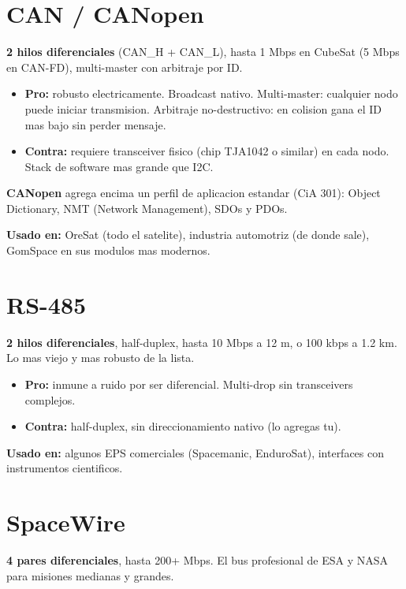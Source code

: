 \documentclass[11pt,a4paper,oneside,openright]{book}
\begin{document}
\section{CAN / CANopen}

\textbf{2 hilos diferenciales} (CAN\_H + CAN\_L), hasta 1 Mbps en
CubeSat (5 Mbps en CAN-FD), multi-master con arbitraje por ID.

\begin{itemize}[leftmargin=2em]
  \item \textbf{Pro:} robusto electricamente. Broadcast nativo. Multi-master:
    cualquier nodo puede iniciar transmision. Arbitraje no-destructivo:
    en colision gana el ID mas bajo sin perder mensaje.
  \item \textbf{Contra:} requiere transceiver fisico (chip TJA1042 o
    similar) en cada nodo. Stack de software mas grande que I2C.
\end{itemize}

\textbf{CANopen} agrega encima un perfil de aplicacion estandar (CiA
301): Object Dictionary, NMT (Network Management), SDOs y PDOs.

\textbf{Usado en:} OreSat (todo el satelite), industria automotriz
(de donde sale), GomSpace en sus modulos mas modernos.

\section{RS-485}

\textbf{2 hilos diferenciales}, half-duplex, hasta 10 Mbps a 12 m, o
100 kbps a 1.2 km. Lo mas viejo y mas robusto de la lista.

\begin{itemize}[leftmargin=2em]
  \item \textbf{Pro:} inmune a ruido por ser diferencial. Multi-drop
    sin transceivers complejos.
  \item \textbf{Contra:} half-duplex, sin direccionamiento nativo (lo
    agregas tu).
\end{itemize}

\textbf{Usado en:} algunos EPS comerciales (Spacemanic, EnduroSat),
interfaces con instrumentos cientificos.

\section{SpaceWire}

\textbf{4 pares diferenciales}, hasta 200+ Mbps. El bus profesional de
ESA y NASA para misiones medianas y grandes.
\end{document}

